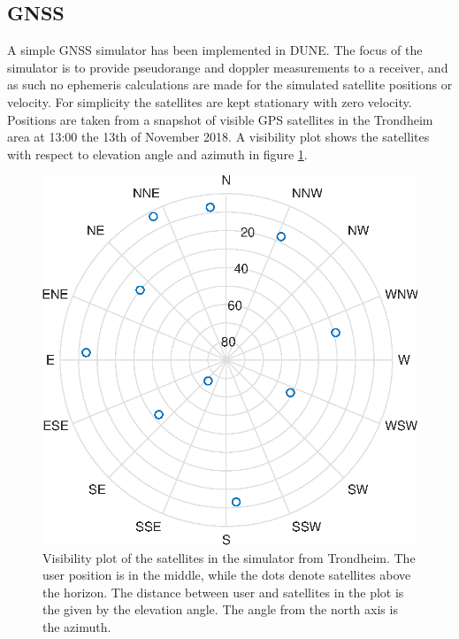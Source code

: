 \subsection{GNSS}
    A simple GNSS simulator has been implemented in DUNE. The focus of the simulator is to provide pseudorange and doppler measurements to a receiver, and as such no ephemeris calculations are made for the simulated satellite positions or velocity. For simplicity the satellites are kept stationary with zero velocity. Positions are taken from a snapshot of visible GPS satellites in the Trondheim area at 13:00 the 13th of November 2018. A visibility plot shows the satellites with respect to elevation angle and azimuth in figure \ref{fig:visplot}.\\

    \begin{figure}[!htbp]
        \centering
        \includegraphics[scale=0.7]{Implementation/Images/visibilityplot.eps}
        \caption{Visibility plot of the satellites in the simulator from Trondheim. The user position is in the middle, while the dots denote satellites above the horizon. The distance between user and satellites in the plot is the given by the elevation angle. The angle from the north axis is the azimuth.}
        \label{fig:visplot}
    \end{figure}

